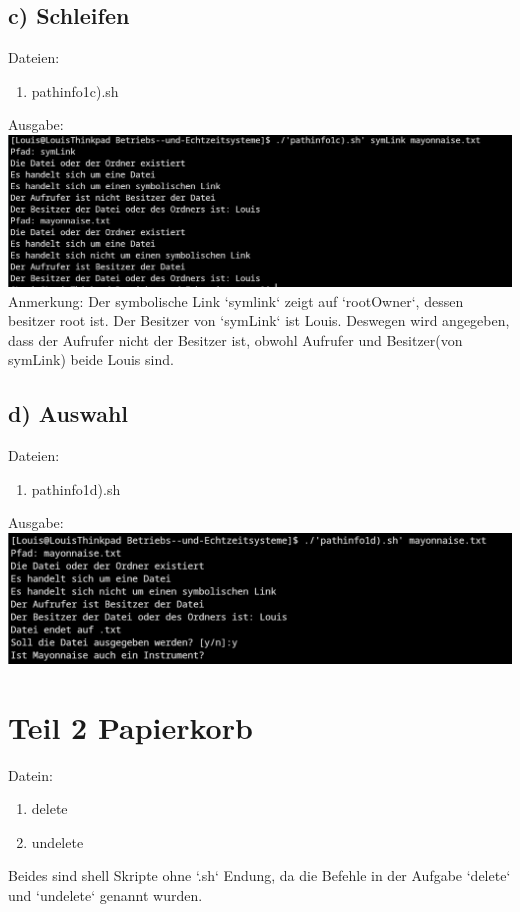 \documentclass[a4paper,10pt]{article}
\begin{document}
\subsection{c) Schleifen}
Dateien:
\begin{enumerate}
 \item pathinfo1c).sh
\end{enumerate}
Ausgabe:\\
\includegraphics[width=1\textwidth]{pathinfo1c)_ausgabe.png} \\
Anmerkung: Der symbolische Link `symlink` zeigt auf `rootOwner`, dessen besitzer root ist. Der Besitzer von `symLink` ist Louis. Deswegen wird angegeben, dass der Aufrufer nicht der Besitzer ist, obwohl Aufrufer und Besitzer(von symLink) beide Louis sind.
\subsection{d) Auswahl}
Dateien:
\begin{enumerate}
 \item pathinfo1d).sh
\end{enumerate}
Ausgabe: \\
\includegraphics[width=1\textwidth]{pathinfo1d)_ausgabe.png}

\section{Teil 2 Papierkorb}
Datein:
\begin{enumerate}
 \item delete
 \item undelete
\end{enumerate}
Beides sind shell Skripte ohne `.sh` Endung, da die Befehle in der Aufgabe `delete` und `undelete` genannt wurden.\pagebreak
\end{document}
